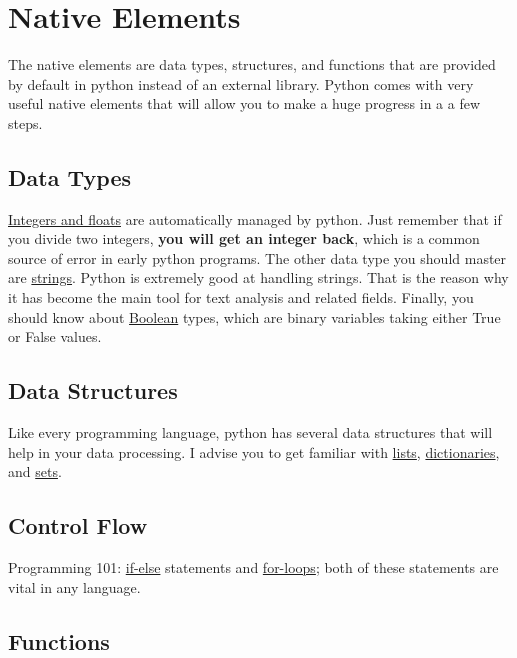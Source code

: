 \documentclass[11pt]{article}
\begin{document}
\section{Native Elements}

The native elements are data types, structures, and functions that are provided by default in python instead of an external library. Python comes with very useful native elements that will allow you to make a huge progress in a a few steps.


\subsection{Data Types}

\href{https://docs.python.org/2/tutorial/introduction.html#numbers}{Integers and floats} are automatically managed by python. Just remember that if you divide two integers, \textbf{you will get an integer back}, which is a common source of error in early python programs. The other data type you should master are \href{https://docs.python.org/2/tutorial/introduction.html#strings}{strings}. Python is extremely good at handling strings. That is the reason why it has become the main tool for text analysis and related fields. Finally, you should know about \href{}{Boolean} types, which are binary variables taking either True or False values.


\subsection{Data Structures}

Like every programming language, python has several data structures that will help in your data processing. I advise you to get familiar with \href{https://docs.python.org/2/tutorial/datastructures.html#lists}{lists}, \href{https://docs.python.org/2/tutorial/datastructures.html#lists}{dictionaries}, and \href{https://docs.python.org/2/tutorial/datastructures.html#sets}{sets}.


\subsection{Control Flow}

Programming 101: \href{https://docs.python.org/2/reference/compound_stmts.html#if}{if-else} statements and \href{https://docs.python.org/2/reference/compound_stmts.html#for}{for-loops}; both of these statements are vital in any language. 


\subsection{Functions}
\end{document}
